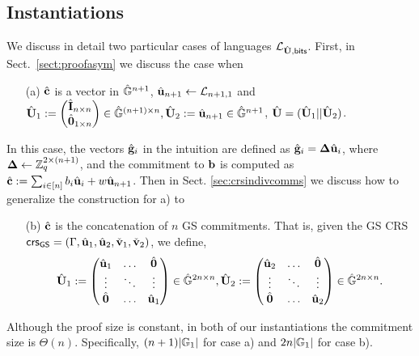 \subsection{Instantiations} \label{subsec:instantiations}
We discuss in detail two particular cases of languages $\mathcal{\mathcal{L}}_{{\hat{\mathbf{{U}}}},\mathsf{bits}}$. First, in Sect.~\ref{sect:proofasym} we discuss the case when 
\begin{itemize}
\item[(a)] ${\hat{\mathbf{c}}}$ is a vector in ${\hat{\mathbb{G}}}^{n+1}$,  ${\hat{\mathbf{u}}}_{n+1} \leftarrow \mathcal{L}_{n+1,1}$ and
 $\hat{\mathbf{{U}}}_1:=\begin{pmatrix}{\hat{\mathbf{{I}}}}_{n\times n}\\{\hat{\mathbf{{0}}}}_{1\times n}\end{pmatrix} \in {\ensuremath{\hat{\mathbb{G}}}}^{(n+1) \times n}, {\hat{\mathbf{{U}}}}_2:={\hat{\mathbf{u}}}_{n+1} \in {\ensuremath{\hat{\mathbb{G}}}}^{n+1}$, ${\hat{\mathbf{{U}}}}=({\hat{\mathbf{{U}}}}_1|| {\hat{\mathbf{{U}}}}_2)$.    
\end{itemize}
In this case, the vectors $\hat{\mathbf{g}}_i$ in the intuition are defined as $\hat{\mathbf{g}}_i=\mathbf{{\Delta}} {\hat{\mathbf{u}}}_i$, where $\mathbf{{\Delta}}\gets\mathbb{Z}_q^{2\times(n+1)}$, and the commitment 
to $\mathbf{b}$ is computed as ${\hat{\mathbf{c}}}:=\sum_{i\in[n]}b_i{\hat{\mathbf{u}}}_i+w{\hat{\mathbf{u}}}_{n+1}$.
Then in Sect. \ref{sec:crsindivcomms} we discuss how to generalize the construction for a) to 
\begin{itemize}
 \item[(b)] ${\hat{\mathbf{c}}}$ is the concatenation of $n$ GS commitments. That is, given the  GS CRS   $\mathsf{crs}_{\mathsf{GS}}=(\Gamma,{\hat{\mathbf{u}}}_1,{\hat{\mathbf{u}}}_2,\check{\mathbf{v}}_1,\check{\mathbf{v}}_2)$, we define,
$${\hat{\mathbf{{U}}}}_1:=  \begin{pmatrix} {\hat{\mathbf{u}}}_1 & \ldots & {\hat{\mathbf{0}}}\\ \vdots & \ddots & \vdots \\   {\hat{\mathbf{0}}} & \ldots & {\hat{\mathbf{u}}}_1  \end{pmatrix} \in {\ensuremath{\hat{\mathbb{G}}}}^{2n \times n},  {\hat{\mathbf{{U}}}}_2:= \begin{pmatrix} {\hat{\mathbf{u}}}_2 & \ldots & {\hat{\mathbf{0}}}\\ \vdots & \ddots & \vdots \\  {\hat{\mathbf{0}}} & \ldots & {\hat{\mathbf{u}}}_2  \end{pmatrix} \in {\ensuremath{\hat{\mathbb{G}}}}^{2n \times n}.$$ 
\end{itemize}

Although the proof size is constant, in both of our instantiations the commitment size is $\Theta(n)$. Specifically, $(n+1)|\mathbb{G}_1|$ for case a) and $2n|\mathbb{G}_1|$ for case b).


